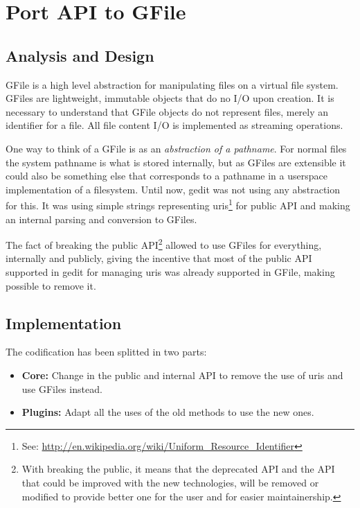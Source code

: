 
\chapter[Port API to GFile]{Port API to GFile}


\section{Analysis and Design}

GFile is a high level abstraction for manipulating files on a virtual file system. GFiles are lightweight, immutable objects that do no I/O upon creation. It is necessary to understand that GFile objects do not represent files, merely an identifier for a file. All file content I/O is implemented as streaming operations.

One way to think of a GFile is as an \emph{abstraction of a pathname}. For normal files the system pathname is what is stored internally, but as GFiles are extensible it could also be something else that corresponds to a pathname in a userspace implementation of a filesystem.\cite{website:gio} Until now, gedit was not using any abstraction for this. It was using simple strings representing uris\footnote{See: \url{http://en.wikipedia.org/wiki/Uniform_Resource_Identifier}} for public API and making an internal parsing and conversion to GFiles.

The fact of breaking the public API\footnote{With breaking the public, it means that the deprecated API and the API that could be improved with the new technologies, will be removed or modified to provide better one for the user and for easier maintainership.} allowed to use GFiles for everything, internally and publicly, giving the incentive that most of the public API supported in gedit for managing uris was already supported in GFile, making possible to remove it.

\newpage
\section{Implementation}

The codification has been splitted in two parts:
\begin{itemize}
  \item \textbf{Core:} Change in the public and internal API to remove the use of uris and use GFiles instead.
  \item \textbf{Plugins:} Adapt all the uses of the old methods to use the new ones.
\end{itemize}


